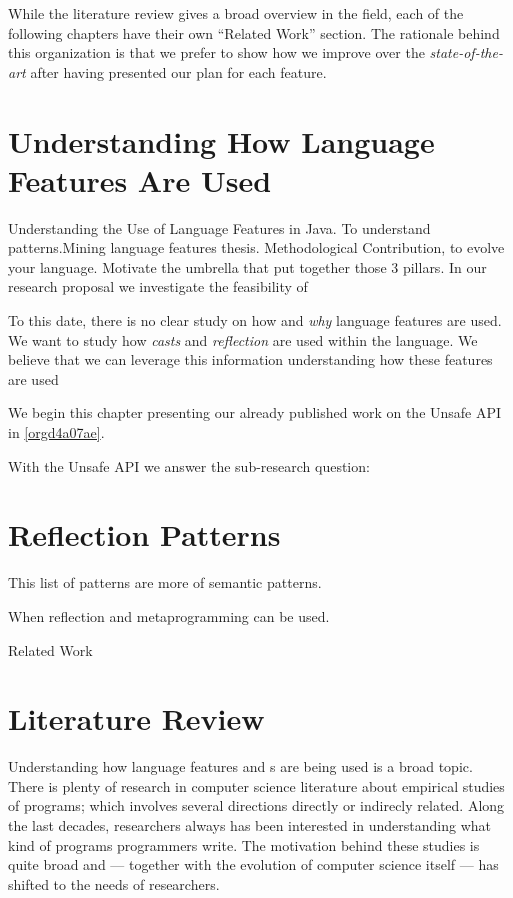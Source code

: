 While the literature review gives a broad overview in the field, each of the following chapters have their own ``Related Work'' section. 
The rationale behind this organization is that we prefer to show how we improve over the \emph{state-of-the-art} after having presented our plan for each feature.

\chapter{Understanding How \java{} Language Features Are Used}
\label{sec:org6351c27}
Understanding the Use of Language Features in Java.
To understand patterns.Mining language features thesis.
Methodological Contribution, to evolve your language.
Motivate the umbrella that put together those 3 pillars.
In our research proposal we investigate the feasibility of

To this date, there is no clear study on how and \emph{why} language features are used.
We want to study how \emph{casts} and \emph{reflection} are used within the \java{} language.
We believe that we can leverage this information
understanding how these features are used

We begin this chapter presenting our already published work on the Unsafe API in \ref{orgd4a07ae}.

With the Unsafe API we answer the sub-research question:

\chapter{Reflection Patterns \label{org7b69368}}
\label{sec:org2457f5d}

This list of patterns are more of semantic patterns.

When reflection and metaprogramming can be used.

Related Work

\chapter{Literature Review \label{org53ba504}}
\label{sec:org8b0bad6}
Understanding how language features and \api{}s are being used is a broad topic.
There is plenty of research in computer science literature about empirical studies of programs; which involves several directions directly or indirecly related.
Along the last decades, researchers always has been interested in understanding what kind of programs programmers write.
The motivation behind these studies is quite broad and --- together with the evolution of computer science itself --- has shifted to the needs of researchers.

